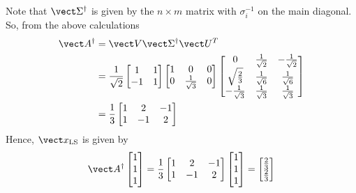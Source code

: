 \documentclass{homework}
\begin{document}
\begin{solution}
\renewcommand{\arraystretch}{2}
Note that $\vect \Sigma^\dagger$ is given by the $n\times m$ matrix with $\sigma_i^{-1}$ on the main diagonal.  So, from the above calculations
\begin{align*}
  \vect A^\dagger &= \vect V \vect \Sigma^\dagger \vect U^T \\
  &=\frac 1{\sqrt{2}} 
  \begin{bmatrix} 1 & 1\\ -1 & 1 \end{bmatrix}
  \begin{bmatrix} 1 & 0 & 0 \\ 0 & \frac 1{\sqrt{3}} & 0\end{bmatrix}
  \begin{bmatrix} 
    0 & \frac 1{\sqrt2} & -\frac 1{\sqrt2}\\ 
    \sqrt{\frac 23} & \frac 1{\sqrt6} & \frac1{\sqrt6}\\
    -\frac1{\sqrt3} & \frac1{\sqrt3} & \frac1{\sqrt3}
  \end{bmatrix}\\
  &=
  \frac 13 \begin{bmatrix}
  1 & 2 & -1\\
  1 & -1 & 2
  \end{bmatrix}
\end{align*}
Hence, $\vect x_{\mathrm{LS}}$ is given by
\renewcommand{\arraystretch}{1.5}
$$
\vect A^\dagger
   \begin{bmatrix}
    1\\
    1\\
    1\\
  \end{bmatrix}
  =
  \frac 13 \begin{bmatrix}
  1 & 2 & -1\\
  1 & -1 & 2
  \end{bmatrix}
   \begin{bmatrix}
    1\\
    1\\
    1\\
  \end{bmatrix}
  =\begin{bmatrix} \frac23 \\ \frac 23\end{bmatrix}
$$

\end{solution}

\end{document}
